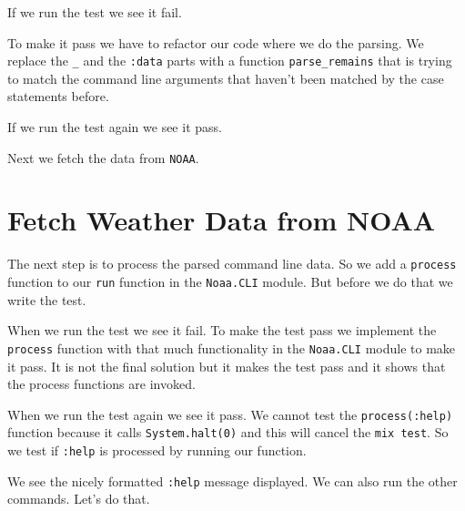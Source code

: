 \documentclass[10pt, a4paper]{article}
\newcommand{\includecode}[3]{}
\begin{document}
\includecode{test/cli\_test3.exs}{lst:clitest3}{listings/cli_test3.exs}

If we run the test we see it fail.

\includecode{mix test}{lst:testresult5}{listings/test-result4}

To make it pass we have to refactor our code where we do the parsing. We
replace the \texttt{\_} and the \texttt{:data} parts with a function
\texttt{parse\_remains} that is trying to match the command line arguments 
that haven't been matched by the case statements before. 

\includecode{lib/cli4.ex}{lst:cli4}{listings/cli4.ex}

If we run the test again we see it pass.

\includecode{mix test}{lst:testresult6}{listings/test-result5}

Next we fetch the data from \texttt{NOAA}.

\section{Fetch Weather Data from NOAA}
The next step is to process the parsed command line data. So we add a 
\texttt{process} function to our \texttt{run} function in the 
\texttt{Noaa.CLI} module. But before we do that we write the test.

\includecode{test/cli\_process\_test.exs}{lst:clitest4}
            {listings/cli_process_test.exs}

When we run the test we see it fail. To make the test pass we implement the
\texttt{process} function with that much functionality in the \texttt{Noaa.CLI}
module to make it pass. It is not the final solution but it makes the test pass 
and it shows that the process functions are invoked.

\includecode{lib/noaa/cli5.ex}{lst:cli5}{listings/cli5.ex}

When we run the test again we see it pass. We cannot test the 
\texttt{process(:help)} function because it calls \texttt{System.halt(0)} and
this will cancel the \texttt{mix test}. So we test if \texttt{:help} is
processed by running our function.

\includecode{Running the function with mix}{lst:mixhelp}{listings/run-help}

We see the nicely formatted \texttt{:help} message displayed. We can also run
the other commands. Let's do that.

\includecode{Running :data with mix}{lst:mixdata}{listings/run-data}
\end{document}
